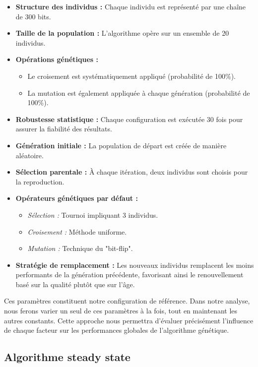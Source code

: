 \documentclass{article}
\begin{document}
\begin{itemize}
    \item \textbf{Structure des individus :} Chaque individu est représenté par une chaîne de 300 bits.
    \item \textbf{Taille de la population :} L'algorithme opère sur un ensemble de 20 individus.
    \item \textbf{Opérations génétiques :}
    \begin{itemize}
        \item Le croisement est systématiquement appliqué (probabilité de 100\%).
        \item La mutation est également appliquée à chaque génération (probabilité de 100\%).
    \end{itemize}
    \item \textbf{Robustesse statistique :} Chaque configuration est exécutée 30 fois pour assurer la fiabilité des résultats.
    \item \textbf{Génération initiale :} La population de départ est créée de manière aléatoire.
    \item \textbf{Sélection parentale :} À chaque itération, deux individus sont choisis pour la reproduction.
    \item \textbf{Opérateurs génétiques par défaut :}
    \begin{itemize}
        \item \textit{Sélection :} Tournoi impliquant 3 individus.
        \item \textit{Croisement :} Méthode uniforme.
        \item \textit{Mutation :} Technique du "bit-flip".
    \end{itemize}
    \item \textbf{Stratégie de remplacement :} Les nouveaux individus remplacent les moins performants de la génération précédente, favorisant ainsi le renouvellement basé sur la qualité plutôt que sur l'âge.
\end{itemize}

Ces paramètres constituent notre configuration de référence. Dans notre analyse, nous ferons varier un seul de ces paramètres à la fois, tout en maintenant les autres constants. Cette approche nous permettra d'évaluer précisément l'influence de chaque facteur sur les performances globales de l'algorithme génétique.

\subsection{Algorithme steady state}
\end{document}
